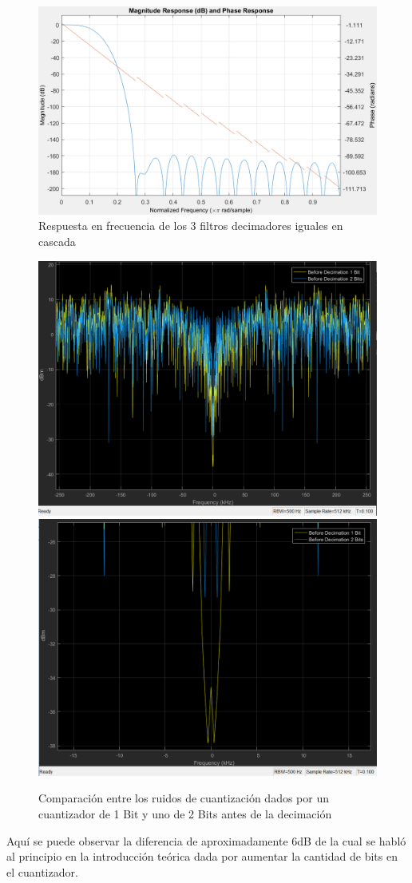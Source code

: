 \documentclass[assd_tp3_main.tex]{subfiles}
\begin{document}
\begin{figure}[H]
\centering
\includegraphics[width=0.8\linewidth]{images/ej4/Decimation_3filt_cascade.png}
\caption{Respuesta en frecuencia de los 3 filtros decimadores iguales en cascada}
\label{fig:Decimation_3filt_cascade}
\end{figure}


\begin{figure}[H]
\centering
\includegraphics[width=0.75\linewidth]{images/ej4/noise_comparison.png}
\includegraphics[width=0.75\linewidth]{images/ej4/noise_comparizoom.png}
\caption{Comparación entre los ruidos de cuantización dados por un cuantizador de 1 Bit y uno de 2 Bits antes de la decimación}
\label{fig:noise_comparison}
\end{figure}
Aquí se puede observar la diferencia de aproximadamente 6dB de la cual se habló al principio en la introducción teórica dada por aumentar la cantidad de bits en el cuantizador.
\end{document}
